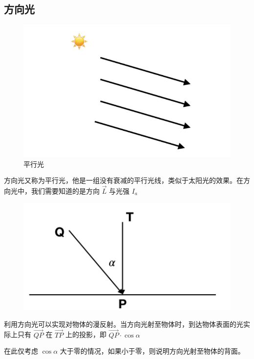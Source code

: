 \documentclass[12pt,oneside,a4paper]{ctexart}
\begin{document}
\subsection{方向光}
\begin{figure}[H]
	\centering
	\includegraphics[scale=0.3]{Picture/latex5.1.png}
	\vspace{-2ex}
	\caption{平行光}
\end{figure}

方向光又称为平行光，他是一组没有衰减的平行光线，类似于太阳光的效果。在方向光中，我们需要知道的是方向 $\vec{L}$ 与光强 $I_{a}$
\begin{figure}[H]
	\centering
	\includegraphics[scale=0.3]{Picture/latex5.2.png}
	\vspace{-2ex}
\end{figure}

利用方向光可以实现对物体的漫反射。当方向光射至物体时，到达物体表面的光实际上只有 $\vec{QP}$ 在 $\vec{TP}$ 上的投影，即 $\vec{QP} \cdot \cos{\alpha}$ \cite{ref1}

在此仅考虑 $\cos{\alpha}$ 大于零的情况，如果小于零，则说明方向光射至物体的背面。
\end{document}
